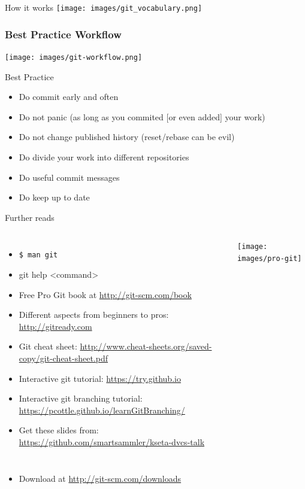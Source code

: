 \documentclass{beamer}
\begin{document}


\begin{frame}{How it works}
	\texttt{[image: images/git\_vocabulary.png]}
\end{frame}

\begin{frame}
	\frametitle{Best Practice Workflow}
	\texttt{[image: images/git-workflow.png]}
\end{frame}

\begin{frame}{Best Practice}
	\begin{itemize}
		\item{Do commit early and often}
		\item{Do not panic (as long as you commited [or even added] your work)}
		\item{Do not change published history (reset/rebase can be evil)}
		\item{Do divide your work into different repositories}
		\item{Do useful commit messages}
		\item{Do keep up to date}
	\end{itemize}
\end{frame}

\begin{frame}{Further reads}
  \begin{columns}[T,onlytextwidth]
      \begin{itemize}
        \item \texttt{\$ man git} %
	\item git help <command>
        \item Free Pro Git book at \url{http://git-scm.com/book}
        \item Different aspects from beginners to pros: \url{http://gitready.com}
        \item Git cheat sheet: \url{http://www.cheat-sheets.org/saved-copy/git-cheat-sheet.pdf}
	\item Interactive git tutorial: \url{https://try.github.io}
	\item Interactive git branching tutorial: \url{https://pcottle.github.io/learnGitBranching/}
	\item Get these slides from: \url{https://github.com/smartsammler/kseta-dvcs-talk}\\
      \end{itemize}
      \centering
      \texttt{[image: images/pro-git]}
  \end{columns}
  \begin{itemize}
    \item Download at \url{http://git-scm.com/downloads}
  \end{itemize}
\end{frame}
\end{document}
